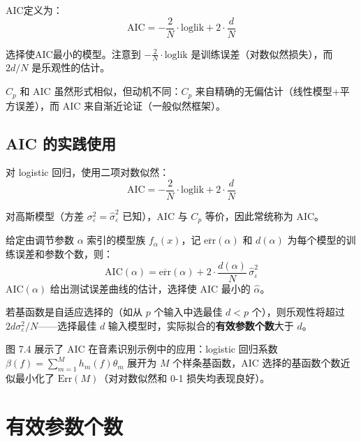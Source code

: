 AIC定义为：
\begin{equation}\label{eq:AIC}
    \mathrm{AIC} = -\frac{2}{N}\cdot\text{loglik} + 2\cdot\frac{d}{N}
\end{equation}

选择使AIC最小的模型。注意到 $-\frac{2}{N}\cdot\text{loglik}$ 是训练误差（对数似然损失），而 $2d/N$ 是乐观性的估计。

\begin{remark}
    $C_p$ 和 AIC 虽然形式相似，但动机不同：$C_p$ 来自精确的无偏估计（线性模型+平方误差），而 AIC 来自渐近论证（一般似然框架）。
\end{remark}

\subsection{AIC 的实践使用}

对 logistic 回归，使用二项对数似然：
\begin{equation}\label{eq:AIC_logistic}
    \mathrm{AIC} = -\frac{2}{N}\cdot\text{loglik} + 2\cdot\frac{d}{N}
\end{equation}

对高斯模型（方差 $\sigma_\varepsilon^2 = \hat{\sigma}_\varepsilon^2$ 已知），AIC 与 $C_p$ 等价，因此常统称为 AIC。

给定由调节参数 $\alpha$ 索引的模型族 $f_\alpha(x)$，记 $\overline{\mathrm{err}}(\alpha)$ 和 $d(\alpha)$ 为每个模型的训练误差和参数个数，则：
\begin{equation}\label{eq:AIC_alpha}
    \mathrm{AIC}(\alpha) = \overline{\mathrm{err}}(\alpha) + 2\cdot\frac{d(\alpha)}{N}\,\hat{\sigma}_\varepsilon^2
\end{equation}
AIC$(\alpha)$ 给出测试误差曲线的估计，选择使 AIC 最小的 $\hat{\alpha}$。

\begin{remark}
    若基函数是自适应选择的（如从 $p$ 个输入中选最佳 $d<p$ 个），则乐观性将超过 $2d\sigma_\varepsilon^2/N$——选择最佳 $d$ 输入模型时，实际拟合的\textbf{有效参数个数}大于 $d$。
\end{remark}

图 7.4 展示了 AIC 在音素识别示例中的应用：logistic 回归系数 $\beta(f) = \sum_{m=1}^{M} h_m(f)\theta_m$ 展开为 $M$ 个样条基函数，AIC 选择的基函数个数近似最小化了 $\mathrm{Err}(M)$（对对数似然和 0-1 损失均表现良好）。

\section{有效参数个数}

